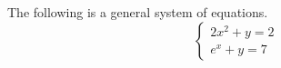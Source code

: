 \begin{example}The following is a general system of equations.
    \[\begin{cases}
        2x^{2}+y=2\\
        e^{x}+y=7
    \end{cases}\]
\end{example}